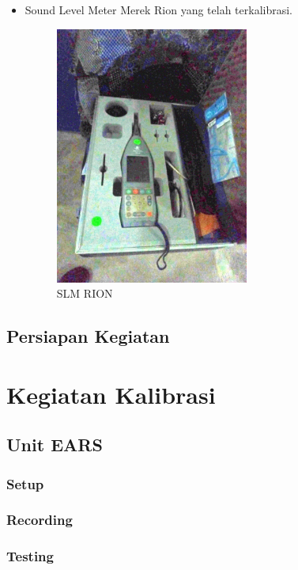 \documentclass{article}
\begin{document}
\begin{itemize}
		\item Sound Level Meter Merek Rion yang telah terkalibrasi.

		\begin{figure}[H]
			\centering
			\includegraphics[width=180pt,angle=0]{images/tools_slm_box}
			\caption{SLM RION}
		\end{figure}

	\end{itemize}

	\subsection{Persiapan Kegiatan}

	\newpage
	\section{Kegiatan Kalibrasi}

	\subsection{Unit EARS}

	\subsubsection{Setup}

	\subsubsection{Recording}

	\subsubsection{Testing}
\end{document}
